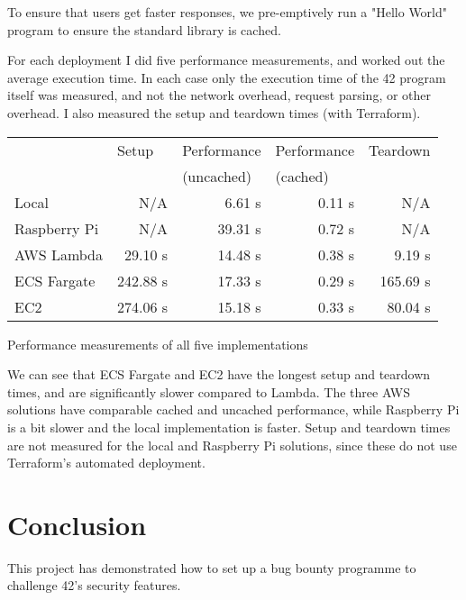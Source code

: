 To ensure that users get faster responses, we pre-emptively run a "Hello World" program to ensure the standard library is cached.

For each deployment I did five performance measurements, and worked out the average execution time. In each case only the execution time of the 42 program itself was measured, and not the network overhead, request parsing, or other overhead. I also measured the setup and teardown times (with Terraform).

\begin{fig}[H]
\begin{center}
\begin{tabular}{|l|r|r|r|r|}
\hline
\rowcolor{tableheadercolour}
& \multicolumn{1}{l|}{Setup} & \multicolumn{1}{l|}{Performance} & \multicolumn{1}{l|}{Performance} & \multicolumn{1}{l|}{Teardown} \\
\rowcolor{tableheadercolour}
& & \multicolumn{1}{l|}{(uncached)} & \multicolumn{1}{l|}{(cached)} & \\ \hline
Local & N/A & 6.61 s & 0.11 s & N/A \\ \hline
Raspberry Pi & N/A & 39.31 s & 0.72 s & N/A \\ \hline
AWS Lambda & 29.10 s & 14.48 s & 0.38 s & 9.19 s \\ \hline
ECS Fargate & 242.88 s & 17.33 s & 0.29 s & 165.69 s \\ \hline
EC2 & 274.06 s & 15.18 s & 0.33 s & 80.04 s \\ \hline
\end{tabular}
\caption{Performance measurements of all five implementations}
\end{center}
\end{fig}

We can see that ECS Fargate and EC2 have the longest setup and teardown times, and are significantly slower compared to Lambda. The three AWS solutions have comparable cached and uncached performance, while Raspberry Pi is a bit slower and the local implementation is faster. Setup and teardown times are not measured for the local and Raspberry Pi solutions, since these do not use Terraform's automated deployment.

\chapter{Conclusion}

This project has demonstrated how to set up a bug bounty programme to challenge 42's security features.

